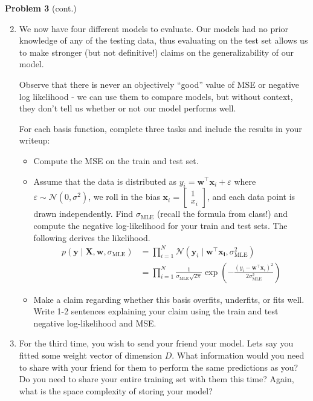 \documentclass[submit]{harvardml}
\begin{document}
\newpage
\begin{framed}
\noindent\textbf{Problem 3} (cont.)\\
\begin{enumerate}
\setcounter{enumi}{1}
\item 

We now have four different models to evaluate. Our models had no
prior knowledge of any of the testing data, thus evaluating on
the test set allows us to make stronger (but not definitive!) 
claims on the generalizability of our model.

Observe that there is never an objectively ``good'' value of MSE or negative log likelihood - we can use them to compare models, but without context, they don't tell us whether or not our model performs well.

For each basis function, complete three tasks and include the
results in your writeup: 
\begin{itemize}
\item Compute the MSE on the train and test set. 

\item Assume that the data is distributed as 
$y_i = \mathbf{w}^\top \mathbf{x}_i + \varepsilon$ where 
$\varepsilon \sim \mathcal{N}(0, \sigma^2)$, we roll in the bias 
$\mathbf{x}_i = \begin{bmatrix} 1 \\ x_i \end{bmatrix}$, and each data point
is drawn independently. Find $\sigma_{\text{MLE}}$ (recall the formula from class!) and compute the 
negative log-likelihood for your train and test sets. The following derives the likelihood.
\begin{align*} p(\mathbf{y}\mid \mathbf{X},\mathbf{w},\sigma_{\text{MLE}}) 
&= \prod_{i=1}^N \mathcal{N}(\mathbf{y}_i \mid \mathbf{w}^\top\mathbf{x_i}, \sigma_{\text{MLE}}^2) \\
&= \prod_{i=1}^N \frac{1}{\sigma_{\text{MLE}}\sqrt{2\pi}}\exp\left(-\frac{(y_i - \mathbf{w}^\top \mathbf{x}_i)^2}{2\sigma_{\text{MLE}}^2}\right)
\end{align*}

\item Make a claim regarding whether this basis overfits, 
underfits, or fits well. Write 1-2 sentences explaining your 
claim using the train and test negative log-likelihood and MSE.

\end{itemize}
\item For the third time, you wish to send your friend your model. Lets say you fitted some weight vector of dimension $D$. What information would you need to share with your friend for them to perform the same predictions as you? Do you need to share your entire training set with them this time? Again, what is the space complexity of storing your model?


\end{enumerate}
\end{framed}
\end{document}
